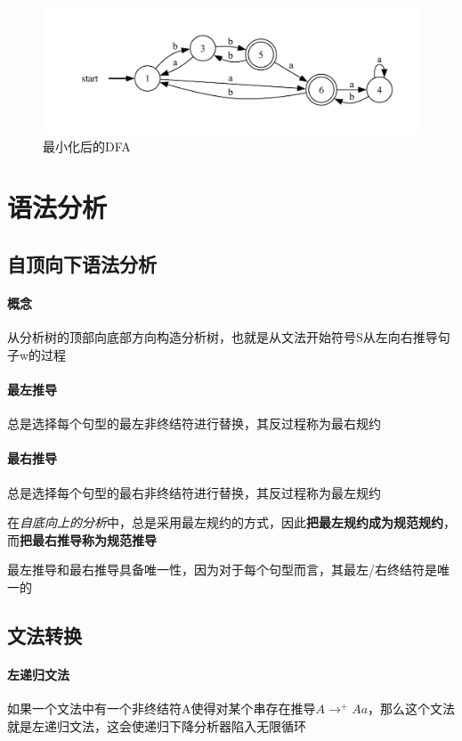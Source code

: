 \documentclass[UTF8]{ctexart} %
\begin{document}
\begin{figure}[H]
    \centering
    \includegraphics[width=\textwidth]{assets/dfa6.pdf}
    \caption{最小化后的DFA}
\end{figure}

\section{语法分析}

\subsection{自顶向下语法分析}

\paragraph{概念} 从分析树的顶部向底部方向构造分析树，也就是从文法开始符号S从左向右推导句子w的过程

\paragraph{最左推导} 总是选择每个句型的最左非终结符进行替换，其反过程称为最右规约

\paragraph{最右推导} 总是选择每个句型的最右非终结符进行替换，其反过程称为最左规约

在\emph{自底向上的分析}中，总是采用最左规约的方式，因此\textbf{把最左规约成为规范规约}，而\textbf{把最右推导称为规范推导}

最左推导和最右推导具备唯一性，因为对于每个句型而言，其最左/右终结符是唯一的

\subsection{文法转换}

\paragraph{左递归文法} 如果一个文法中有一个非终结符A使得对某个串存在推导$A\rightarrow^{+} Aa$，那么这个文法就是左递归文法，这会使递归下降分析器陷入无限循环
\end{document}
